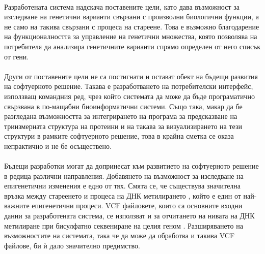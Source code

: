 \documentclass[pdftex,cyrillic,14pt,a4page,twoside,openright]{extreport}
\begin{document}
\paragraph{}
Разработената система надскача поставените цели, като дава възможност за изследване на генетични варианти свързани с произволни биологични функции, а не само на такива свързани с процеса на стареене. Това е възможно благодарение на функционалността за управление на генетични множества, която позволява на потребителя да анализира генетичните варианти спрямо определен от него списък от гени.

\paragraph{}
Други от поставените цели не са постигнати и остават обект на бъдещи развития на софтуерното решение. Такава е разработването на потребителски интерфейс, използващ командния ред, чрез който системата да може да бъде програматично свързвана в по-мащабни биоинформатични системи. Също така, макар да бе разгледана възможността за интегрирането на програма за предсказване на триизмерната структура на протеини и на такава за визуализирането на тези структури в рамките софтуерното решение, това в крайна сметка се оказа непрактично и не бе осъществено.

\paragraph{}
Бъдещи разработки могат да допринесат към развитието на софтуерното решение в редица различни направления. Добавянето на възможност за изследване на епигенетични изменения е едно от тях. Смята се, че съществува значителна връзка между стареенето и процеса на ДНК метилирането \cite{michalak2019}, който е един от най-важните епигенетични процеси. VCF файловете, които са основните входни данни за разработената система, се използват и за отчитането на нивата на ДНК метилиране при бисулфатно секвениране на целия геном \cite{barturen2013, merkel2018}. Разширяването на възможностите на системата, така че да може да обработва и такива VCF файлове, би ѝ дало значително предимство.
\end{document}
